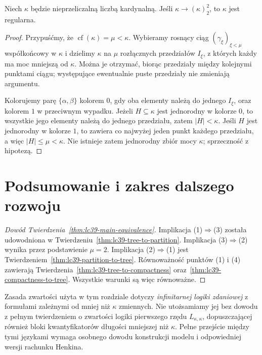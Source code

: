 \begin{twierdzenie}
\label{thm:lc39-partition-regular}
Niech $\kappa$ będzie
nieprzeliczalną liczbą kardynalną.
Jeśli
$\kappa\longrightarrow(\kappa)^2_2$,
to $\kappa$ jest regularna.
\end{twierdzenie}
\begin{proof}
Przypuśćmy, że
$\operatorname{cf}(\kappa)=\mu<\kappa$.
Wybieramy rosnący
ciąg $(\gamma_\xi)_{\xi<\mu}$
współkońcowy w $\kappa$
i dzielimy $\kappa$
na $\mu$ rozłącznych
przedziałów $I_\xi$,
z których każdy ma
moc mniejszą od $\kappa$.
Można je otrzymać,
biorąc przedziały między
kolejnymi punktami ciągu;
występujące ewentualnie
puste przedziały nie
zmieniają argumentu.

Kolorujemy parę
$\{\alpha,\beta\}$ kolorem
$0$, gdy oba elementy
należą do jednego $I_\xi$,
oraz kolorem $1$
w przeciwnym wypadku.
Jeżeli $H\subseteq\kappa$
jest jednorodny
w kolorze $0$, to
wszystkie jego elementy
należą do jednego
przedziału, zatem
$|H|<\kappa$.
Jeśli $H$ jest
jednorodny w kolorze $1$,
to zawiera co najwyżej
jeden punkt każdego
przedziału, a więc
$|H|\le\mu<\kappa$.
Nie istnieje zatem
jednorodny zbiór
mocy $\kappa$;
sprzeczność z hipotezą.
\end{proof}

\section{Podsumowanie i zakres dalszego rozwoju}

\begin{proof}[Dowód Twierdzenia~\ref{thm:lc39-main-equivalence}]
Implikacja (1)$\Rightarrow$(3)
została udowodniona w
Twierdzeniu~\ref{thm:lc39-tree-to-partition}.
Implikacja (3)$\Rightarrow$(2)
wynika przez podstawienie
$\mu=2$.
Implikacja (2)$\Rightarrow$(1)
jest Twierdzeniem~\ref{thm:lc39-partition-to-tree}.
Równoważność punktów (1) i (4)
zawierają
Twierdzenia~\ref{thm:lc39-tree-to-compactness}
oraz~\ref{thm:lc39-compactness-to-tree}.
Wszystkie warunki są więc
równoważne.
\end{proof}

\begin{uwaga}
\label{rem:lc39-first-order}
Zasada zwartości użyta w tym
rozdziale dotyczy
\emph{infinitarnej logiki zdaniowej}
z formułami zależnymi od
mniej niż $\kappa$ zmiennych.
Nie utożsamiamy jej bez dowodu
z pełnym twierdzeniem
o zwartości logiki pierwszego
rzędu $L_{\kappa,\kappa}$,
dopuszczającej również bloki
kwantyfikatorów długości
mniejszej niż $\kappa$.
Pełne przejście między tymi
językami wymaga osobnego
dowodu konstrukcji modelu
i odpowiedniej wersji
rachunku Henkina.
\end{uwaga}

